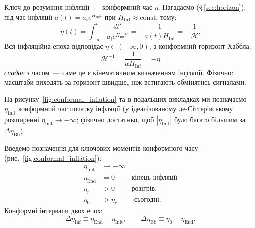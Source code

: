 Ключ до розуміння інфляції~--- конформний час $\eta$.
Нагадаємо (§\,\ref{sec:horizon}): під час інфляції
$a(t) = a_i e^{H_{\text{Inf}} t}$ при $H_{\text{Inf}} \approx \mathrm{const}$,
тому:
\begin{equation}\label{eq:eta_inflation}
	\eta(t) = \int_{-\infty}^{t}\frac{dt'}{a_i e^{H_{\text{Inf}} t'}}
	= -\frac{1}{a(t)H_{\text{Inf}}} = -\frac{1}{\mathcal{H}}.
\end{equation}
Вся інфляційна епоха відповідає $\eta \in (-\infty, 0)$,
а конформний горизонт Хаббла:
\begin{equation}\label{eq:conformal_horizon}
	\mathcal{H}^{-1} = \frac{1}{a H_{\text{Inf}}} = -\eta
\end{equation}
\emph{спадає} з часом~--- саме це є кінематичним визначенням інфляції.
Фізично: масштаби виходять за горизонт швидше, ніж встигають
обмінятись сигналами.

На рисунку~\ref{fig:conformal_inflation} та в подальших викладках
ми позначаємо $\eta_{\text{Init}}$ конформний час початку інфляції (у ідеалізованому де-Сіттерівському розширенні $\eta_{\text{Init}}\to-\infty$;
фізично достатньо, щоб $|\eta_{\text{Init}}|$ було багато більшим за $\Delta\eta_{\text{Bb}}$).

Введемо позначення для ключових моментів конформного часу (рис.~\ref{fig:conformal_inflation}):
\begin{align*}
	\eta_\text{Init}   & \to -\infty                    \\
	\eta_\text{End}    & = 0 \quad \text{--- кінець інфляції} \\
	\eta_r             & > 0 \quad \text{--- розігрів,}                                                         \\
	\eta_0             & > \eta_r \quad \text{--- сьогодні.}
\end{align*}
Конформні інтервали двох епох:
\begin{equation}\label{eq:conformal_intervals}
	\Delta\eta_{\text{Inf}} \equiv \eta_{\text{End}} - \eta_{\text{Init}}, \qquad
	\Delta\eta_{\text{Bb}}  \equiv \eta_0 - \eta_{\text{End}}.
\end{equation}


